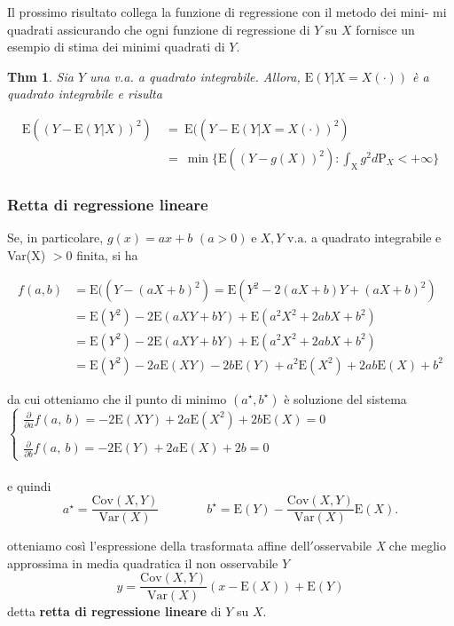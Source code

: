 \documentclass[a4paper,11pt]{article}
\theoremstyle{plain}
\newtheorem{thm}{Thm}[section]
\theoremstyle{definition}
\theoremstyle{remark}
\begin{document}
\noindent
Il prossimo risultato collega la funzione di regressione con il metodo dei mini- mi quadrati assicurando che ogni funzione di regressione di $Y$ su $X$ fornisce un esempio di stima dei minimi quadrati di $Y.$

\begin{thm} Sia $Y$ una v.a. a quadrato integrabile. Allora, $\mathrm{E}(Y|X=X(\cdot))$ \`{e} a quadrato integrabile e risulta

\begin{align*}
\mathrm{E}((Y-\mathrm{E}(Y|X))^{2})\ &=\ \mathrm{E}((Y-\mathrm{E}(Y|X=X(\cdot))^{2})\\
&=\ \min\{\mathrm{E}((Y-g(X))^{2}):\int_{\mathrm{X}}g^{2}d\mathrm{P}_{X}<+\infty\}
\end{align*}
\end{thm}

\subsubsection{Retta di regressione lineare}
Se, in particolare, $g(x)=ax+b$ $(a>0)\mathrm{\; e \;}X, Y$  $\mathrm{v}.\mathrm{a}$. a quadrato integrabile e Var(X) $>0$ finita, si ha

\begin{align*}
f(a, b) &= \mathrm{E}((Y-(aX+b)^{2})=\mathrm{E}(Y^{2}-2(aX+b)Y+(aX+b)^{2})\\
&= \mathrm{E}(Y^{2})-2\mathrm{E}(aXY+bY)+\mathrm{E}(a^{2}X^{2}+2abX+b^{2})\\
&= \mathrm{E}(Y^{2})-2\mathrm{E}(aXY+bY)+\mathrm{E}(a^{2}X^{2}+2abX+b^{2})\\
&=\mathrm{E}(Y^{2})-2a\mathrm{E}(XY)-2b\mathrm{E}(Y)+a^{2}\mathrm{E}(X^{2})+2ab\mathrm{E}(X)+b^{2}
\end{align*}

\noindent
da cui otteniamo che il punto di minimo $(a^{\star}, b^{\star})$ \`{e} soluzione del sistema\\

$ \left\{\begin{array}{l} \displaystyle 
\frac{\partial}{\partial a}f(a,\ b)=-2\mathrm{E}(XY)+2a\mathrm{E}(X^{2})+2b\mathrm{E}(X)=0\\
\\
\displaystyle  \frac{\partial}{\partial b}f(a,\ b)=-2\mathrm{E}(Y)+2a\mathrm{E}(X)+2b=0
\end{array}\right.$\\
\\
\noindent
e quindi
 $$ \displaystyle a^{\star}=\frac{\mathrm{C}\mathrm{o}\mathrm{v}(X,Y)}{\mathrm{V}\mathrm{a}\mathrm{r}(X)}\ \;\;\;\;\;\;\;\;\;\;\; \;\; \displaystyle b^{\star}=\mathrm{E}(Y)-\frac{\mathrm{C}\mathrm{o}\mathrm{v}(X,Y)}{\mathrm{V}\mathrm{a}\mathrm{r}(X)}\mathrm{E}(X).$$

\noindent
otteniamo cos\`{i} l'espressione della trasformata affine $\mathrm{d}\mathrm{e}\mathrm{l}\mathrm{l}'$osservabile {\it X} che meglio approssima in media quadratica il non osservabile $Y$
$$
y=\frac{\mathrm{C}\mathrm{o}\mathrm{v}(X,Y)}{\mathrm{V}\mathrm{a}\mathrm{r}(X)}(x-\mathrm{E}(X))+\mathrm{E}(Y)
$$
\noindent
detta \textbf{retta di regressione lineare} di $Y$ su $X.$
\end{document}
